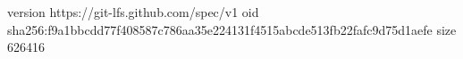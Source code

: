 version https://git-lfs.github.com/spec/v1
oid sha256:f9a1bbcdd77f408587c786aa35e224131f4515abcde513fb22fafc9d75d1aefe
size 626416
